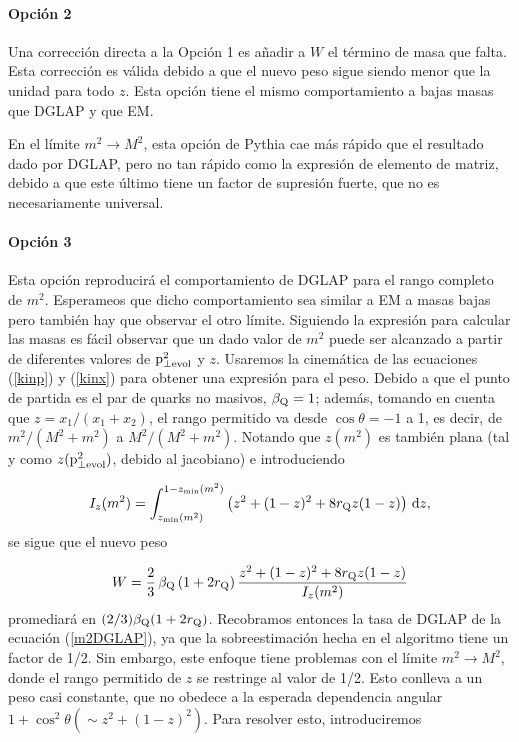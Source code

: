 \paragraph{Opción 2}

Una corrección directa a la Opción 1 es añadir a $W$ el término de masa que falta. Esta corrección es válida debido a que el nuevo peso sigue siendo menor que la unidad para todo $z$. Esta opción tiene el mismo comportamiento a bajas masas que DGLAP y que EM.

En el límite $m^2\to M^2$, esta opción de Pythia cae más rápido que el resultado dado por DGLAP, pero no tan rápido como la expresión de elemento de matriz, debido a que este último tiene un factor de supresión fuerte, que no es necesariamente universal.

\paragraph{Opción 3}

Esta opción reproducirá el comportamiento de DGLAP para el rango completo de $m^2$. Esperameos que dicho comportamiento sea similar a EM a masas bajas pero también hay que observar el otro límite. Siguiendo la expresión para calcular las masas es fácil observar que un dado valor de $m^2$ puede ser alcanzado a partir de diferentes valores de ${\mathrm p}^2_{\perp\mathrm{evol}}$ y $z$. Usaremos la cinemática de las ecuaciones (\ref{kinp}) y (\ref{kinx}) para obtener una expresión para el peso. Debido a que el punto de partida es el par de quarks no masivos, $\beta_{\mathrm Q}=1$; además, tomando en cuenta que $z=x_1/(x_1+x_2)$, el rango permitido va desde $\cos\theta=-1$ a 1, es decir, de $m^2/(M^2+m^2)$ a $M^2/(M^2+m^2)$. Notando que $z(m^2)$ es también plana (tal y como $z({\mathrm p}^2_{\perp\mathrm{evol}})$, debido al jacobiano) e introduciendo

\begin{equation}
I_z(m^2) = \int_{z_{\mathrm{min}}(m^2)}^{1 - z_{\mathrm{min}}(m^2)} 
\left( z^2 + (1 - z)^2 + 8 r_{{\mathrm Q}} z (1 - z) \right) \, {\mathrm d} z,
\label{intz}
\end{equation}
se sigue que el nuevo peso

\begin{equation}
W = \frac{2}{3} \, \beta_{{\mathrm Q}} \, (1 + 2 r_{{\mathrm Q}}) \,
\frac{ z^2 + (1 - z)^2 + 8 r_{{\mathrm Q}} z (1 - z) }{I_z(m^2)}
\label{wtone}
\end{equation}
promediará en $(2/3)\beta_{\mathrm Q}(1+2r_{\mathrm Q})$. Recobramos entonces la tasa de DGLAP de la ecuación (\ref{m2DGLAP}), ya que la sobreestimación hecha en el algoritmo tiene un factor de 1/2. Sin embargo, este enfoque tiene problemas con el límite $m^2\to M^2$, donde el rango permitido de $z$ se restringe al valor de 1/2. Esto conlleva a un peso casi constante, que no obedece a la esperada dependencia angular $1+\cos^2\theta (\sim z^2+(1-z)^2)$. Para resolver esto, introduciremos


